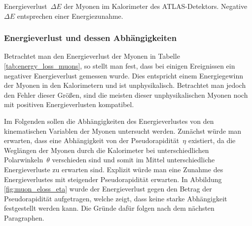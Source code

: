 \documentclass[11pt, a4paper]{article}
\numberwithin{equation}{section}
\begin{document}
\begin{table}[h]
	\centering
	\begin{subtable}{.5\textwidth}
		\centering		
			
	\end{subtable}%
	\begin{subtable}{.5\textwidth}
		\centering
		
	\end{subtable}
	\caption{Energieverlust~$\Delta E$ der Myonen im Kalorimeter des ATLAS-Detektors. Negative $\Delta E$ entsprechen einer Energiezunahme.}
	\label{tab:energy_loss_muons}
\end{table}

\subsubsection{Energieverlust und dessen Abhängigkeiten}
Betrachtet man den Energieverlust der Myonen in Tabelle \ref{tab:energy_loss_muons}, so stellt man fest, dass bei einigen Ereignissen ein negativer Energieverlust gemessen wurde.
Dies entspricht einem Energiegewinn der Myonen in den Kalorimetern und ist unphysikalisch.
Betrachtet man jedoch den Fehler dieser Größen, sind die meisten dieser unphysikalischen Myonen noch mit positiven Energieverlusten kompatibel.

Im Folgenden sollen die Abhängigkeiten des Energieverlustes von den kinematischen Variablen der Myonen untersucht werden.
Zunächst würde man erwarten, dass eine Abhängigkeit von der Pseudorapidität~$\eta$ existiert, da die Weglängen der Myonen durch die Kalorimeter bei unterschiedlichen Polarwinkeln~$\theta$ verschieden sind und somit im Mittel unterschiedliche Energieverluste zu erwarten sind.
Explizit würde man eine Zunahme des Energieverlustes mit steigender Pseudorapidität erwarten.
In Abbildung \ref{fig:muon_eloss_eta} wurde der Energieverlust gegen den Betrag der Pseudorapidität aufgetragen, welche zeigt, dass keine starke Abhängigkeit festgestellt werden kann.
Die Gründe dafür folgen nach dem nächsten Paragraphen.
\end{document}
